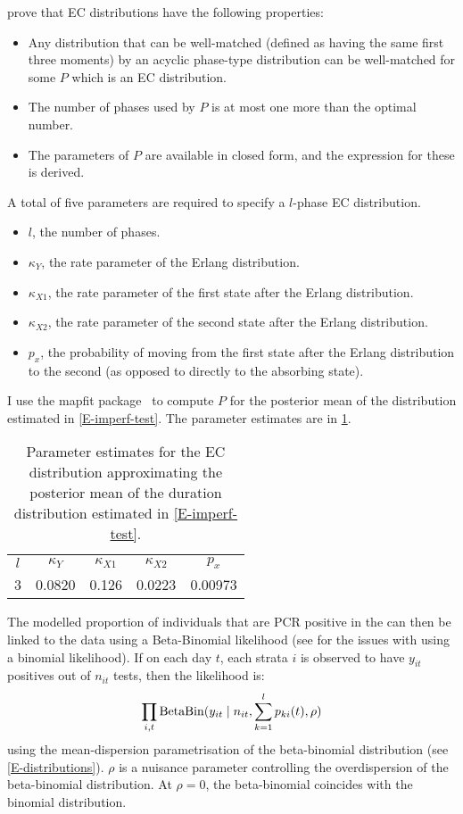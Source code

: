 \documentclass[thesis.tex]{subfiles}
\begin{document}
\Textcite{osogamiClosed} prove that EC distributions have the following properties:
\begin{itemize}
    \item Any distribution that can be well-matched (defined as having the same first three moments) by an acyclic phase-type distribution can be well-matched for some $P$ which is an EC distribution.
    \item The number of phases used by $P$ is at most one more than the optimal number.
    \item The parameters of $P$ are available in closed form, and the expression for these is derived.
\end{itemize}

A total of five parameters are required to specify a $l$-phase EC distribution.
\begin{itemize}
    \item $l$, the number of phases.
    \item $\kappa_Y$, the rate parameter of the Erlang distribution.
    \item $\kappa_{X1}$, the rate parameter of the first state after the Erlang distribution.
    \item $\kappa_{X2}$, the rate parameter of the second state after the Erlang distribution.
    \item $p_x$, the probability of moving from the first state after the Erlang distribution to the second (as opposed to directly to the absorbing state).
\end{itemize}

I use the mapfit package~\autocite{mapfit} to compute $P$ for the posterior mean of the distribution estimated in \cref{E-imperf-test}.
The parameter estimates are in \cref{SEIR:table:ec-params}.
\begin{table}
    \centering
    \begin{tabular}{c c c c c}
        $l$ & $\kappa_Y$ & $\kappa_{X1}$ & $\kappa_{X2}$ & $p_x$ \\
        3 & 0.0820 & 0.126 & 0.0223 & 0.00973  \\
    \end{tabular}
    \caption{Parameter estimates for the EC distribution approximating the posterior mean of the duration distribution estimated in \cref{E-imperf-test}.}
    \label{SEIR:table:ec-params}
\end{table}

The modelled proportion of individuals that are PCR positive in the can then be linked to the data using a Beta-Binomial likelihood (see for the issues with using a binomial likelihood).
If on each day $t$, each strata $i$ is observed to have $y_{it}$ positives out of $n_{it}$ tests, then the likelihood is:
\begin{align}
    \prod_{i,t} \operatorname{BetaBin} (y_{it} \mid n_{it}, \sum_{k=1}^l p_{ki}(t), \rho)
\end{align}
using the mean-dispersion parametrisation of the beta-binomial distribution (see \cref{E-distributions}).
$\rho$ is a nuisance parameter controlling the overdispersion of the beta-binomial distribution.
At $\rho=0$, the beta-binomial coincides with the binomial distribution.
\end{document}

